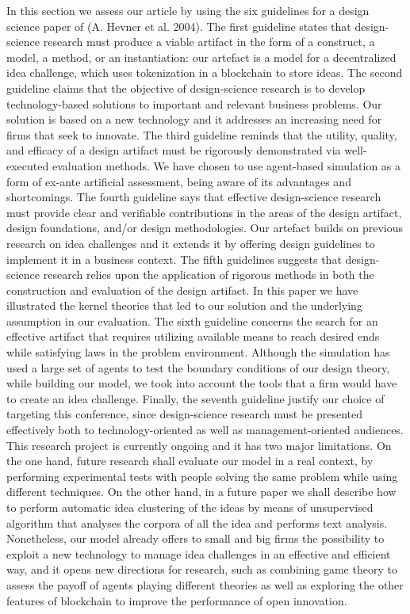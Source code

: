 \documentclass[]{elsarticle} %
\begin{document}
In this section we assess our article by using the six guidelines for a
design science paper of (A. Hevner et al. 2004). The first guideline
states that design-science research must produce a viable artifact in
the form of a construct, a model, a method, or an instantiation: our
artefact is a model for a decentralized idea challenge, which uses
tokenization in a blockchain to store ideas. The second guideline claims
that the objective of design-science research is to develop
technology-based solutions to important and relevant business problems.
Our solution is based on a new technology and it addresses an increasing
need for firms that seek to innovate. The third guideline reminds that
the utility, quality, and efficacy of a design artifact must be
rigorously demonstrated via well-executed evaluation methods. We have
chosen to use agent-based simulation as a form of ex-ante artificial
assessment, being aware of its advantages and shortcomings. The fourth
guideline says that effective design-science research must provide clear
and verifiable contributions in the areas of the design artifact, design
foundations, and/or design methodologies. Our artefact builds on
previous research on idea challenges and it extends it by offering
design guidelines to implement it in a business context. The fifth
guidelines suggests that design-science research relies upon the
application of rigorous methods in both the construction and evaluation
of the design artifact. In this paper we have illustrated the kernel
theories that led to our solution and the underlying assumption in our
evaluation. The sixth guideline concerns the search for an effective
artifact that requires utilizing available means to reach desired ends
while satisfying laws in the problem environment. Although the
simulation has used a large set of agents to test the boundary
conditions of our design theory, while building our model, we took into
account the tools that a firm would have to create an idea challenge.
Finally, the seventh guideline justify our choice of targeting this
conference, since design-science research must be presented effectively
both to technology-oriented as well as management-oriented audiences.
This research project is currently ongoing and it has two major
limitations. On the one hand, future research shall evaluate our model
in a real context, by performing experimental tests with people solving
the same problem while using different techniques. On the other hand, in
a future paper we shall describe how to perform automatic idea
clustering of the ideas by means of unsupervised algorithm that analyses
the corpora of all the idea and performs text analysis. Nonetheless, our
model already offers to small and big firms the possibility to exploit a
new technology to manage idea challenges in an effective and efficient
way, and it opens new directions for research, such as combining game
theory to assess the payoff of agents playing different theories as well
as exploring the other features of blockchain to improve the performance
of open innovation.
\end{document}
